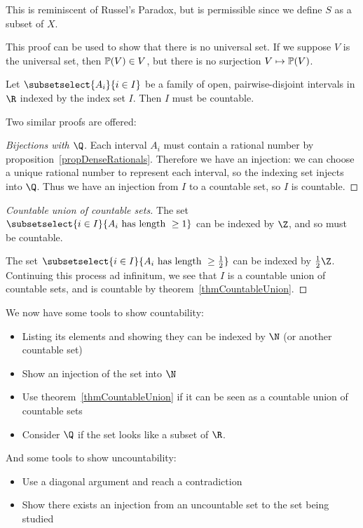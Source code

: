 \documentclass[../Main.tex]{subfiles}
\begin{document}
\begin{remarks}
    \item This is reminiscent of Russel's Paradox, but is permissible since we define $S$ as a subset of $X$.
    \item This proof can be used to show that there is no universal set. If we suppose $V$ is the universal set, then $\mathbb{P}(V) \in V$, but there is no surjection $V \mapsto \mathbb{P}(V)$.
\end{remarks}
\begin{lemma}
    Let $\subsetselect{A_i}{i \in I}$ be a family of open, pairwise-disjoint intervals in $\R$ indexed by the index set $I$. Then $I$ must be countable.
\end{lemma}
Two similar proofs are offered:
\begin{proof}[Bijections with $\Q$]
    Each interval $A_i$ must contain a rational number by proposition~\ref{propDenseRationals}. Therefore we have an injection: we can choose a unique rational number to represent each interval, so the indexing set injects into $\Q$.
    Thus we have an injection from $I$ to a countable set, so $I$ is countable.
\end{proof}
\begin{proof}[Countable union of countable sets]
    The set $\subsetselect{i \in I}{A_i \text{ has length } \geq 1}$ can be indexed by $\Z$, and so must be countable.\par
    The set $\subsetselect{i \in I}{A_i \text{ has length } \geq \frac{1}{2}}$ can be indexed by $\frac{1}{2}\Z$. Continuing this process ad infinitum, we see that $I$ is a countable union of countable sets, and is countable by theorem~\ref{thmCountableUnion}.
\end{proof}
We now have some tools to show countability:
\begin{itemize}
    \item Listing its elements and showing they can be indexed by $\N$ (or another countable set)
    \item Show an injection of the set into $\N$
    \item Use theorem~\ref{thmCountableUnion} if it can be seen as a countable union of countable sets
    \item Consider $\Q$ if the set looks like a subset of $\R$.
\end{itemize}
And some tools to show uncountability:
\begin{itemize}
    \item Use a diagonal argument and reach a contradiction
    \item Show there exists an injection from an uncountable set to the set being studied
\end{itemize}
\end{document}

